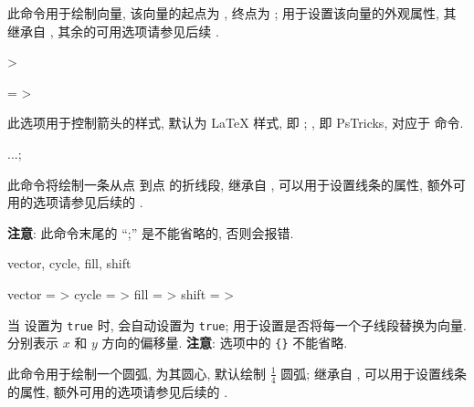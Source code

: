 \documentclass[
  hyper, lang=cn, 
  class=l3dox, 
]{../../zlatex/code/ztex}
\begin{document}
\begin{function}[added=2025-05-13]{\zvector}
  \begin{syntax}
     
  \end{syntax}
  此命令用于绘制向量, 该向量的起点为 , 终点为 ;
   用于设置该向量的外观属性, 其继承自 , 
  其余的可用选项请参见后续 .  
\end{function}


\begin{keyval}[parent=ztool/../vector]{>}
  \begin{syntax}
    \texttt{} = >
  \end{syntax}
  此选项用于控制箭头的样式, 默认为 \LaTeX{} 样式, 即 ; 
  , 即 PsTricks, 对应于  命令.
\end{keyval}



\begin{function}[added=2025-05-13]{\zdraw}
  \begin{syntax}
     ...;
  \end{syntax}
  此命令将绘制一条从点  到点  的折线段,  继承自 , 
  可以用于设置线条的属性, 额外可用的选项请参见后续的 .\par 
  \textbf{注意}: 此命令末尾的 ``;'' 是不能省略的, 否则会报错. 
\end{function}


\begin{keyval}[parent=ztool/../zdraw]{vector, cycle, fill, shift}
  \begin{syntax}
    vector = >
    cycle  = >
    fill   = >
    shift  = >
  \end{syntax}
  当  设置为 \texttt{true} 时,  会自动设置为 \texttt{true}; 
   用于设置是否将每一个子线段替换为向量.  分别表示 $x$ 和 $y$ 方向的偏移量. 
  \textbf{注意}:  选项中的 \texttt{\{\}} 不能省略.
\end{keyval}


\begin{function}[added=2025-05-13]{\zarc}
  \begin{syntax}
  \end{syntax}
  此命令用于绘制一个圆弧, \texttt{} 为其圆心, 默认绘制 $\frac{1}{4}$ 圆弧; 
   继承自 , 
  可以用于设置线条的属性, 额外可用的选项请参见后续的 .
\end{function}
\end{document}
